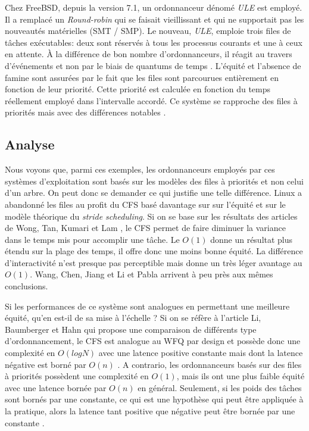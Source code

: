 \documentclass[letterpaper]{article}
\begin{document}
Chez FreeBSD, depuis la version 7.1, un ordonnanceur dénomé \textit{ULE} est employé. Il a remplacé un \textit{Round-robin} qui se faisait vieillissant et qui ne supportait pas les nouveautés matérielles (SMT / SMP). Le nouveau, \textit{ULE}, emploie trois files de tâches exécutables: deux sont réservés à tous les processus courants et une à ceux en attente. À la différence de bon nombre d'ordonnanceurs, il réagit au travers d'événements et non par le biais de quantums de temps \citep{roberson2003ule}. L'équité et l'absence de famine sont assurées par le fait que les files sont parcourues entièrement en fonction de leur priorité. Cette priorité est calculée en fonction du temps réellement employé dans l'intervalle accordé. Ce système se rapproche des files à priorités mais avec des différences notables \citep{mckusick2014design}.

\subsection{Analyse}

Nous voyons que, parmi ces exemples, les ordonnanceurs employés par ces systèmes d'exploitation sont basés sur les modèles des files à priorités et non celui d'un arbre. On peut donc se demander ce qui justifie une telle différence. Linux a abandonné les files au profit du CFS basé davantage sur sur l'équité et sur le modèle théorique du \textit{stride scheduling}. Si on se base sur les résultats des articles de Wong, Tan, Kumari et Lam \citep{4631872, Wong:2008:TAF:1400097.1400102}, le CFS permet de faire diminuer la variance dans le temps mis pour accomplir une tâche. Le $O(1)$ donne un résultat plus étendu sur la plage des temps, il offre donc une moins bonne équité. La différence d'interactivité n'est presque pas perceptible mais donne un très léger avantage au $O(1)$. Wang, Chen, Jiang et Li \citep{5279631} et Pabla \citep{Pabla:2009:CFS:1594371.1594375} arrivent à peu près aux mêmes conclusions.

Si les performances de ce système sont analogues en permettant une meilleure équité, qu'en est-il de sa mise à l'échelle ? Si on se réfère à l'article Li, Baumberger et Hahn \citep{li2009efficient} qui propose une comparaison de différents type d'ordonnancement, le CFS est analogue au WFQ par design et possède donc une complexité en $O(log N)$ avec une latence positive constante mais dont la latence négative est borné par $O(n)$ \citep{234856}. A contrario, les ordonnanceurs basés sur des files à priorités possèdent une complexité en $O(1)$, mais ils ont une plus faible équité avec une latence bornée par $O(n)$ en général. Seulement, si les poids des tâches sont bornés par une constante, ce qui est une hypothèse qui peut être appliquée à la pratique, alors la latence tant positive que négative peut être bornée par une constante \citep{Shreedhar:1995:EFQ:217391.217453}.
\end{document}
